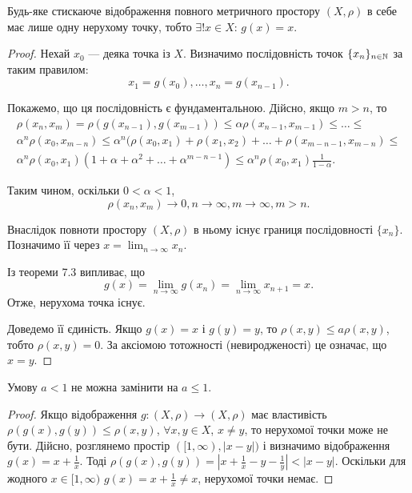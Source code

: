 \begin{theorem}
Будь-яке стискаюче відображення повного
метричного простору $(X, \rho)$ в себе має лише одну
нерухому точку, тобто $\exists! x \in X$: $g(x) = x$.
\end{theorem}

\begin{proof}
Нехай $x_0$ --- деяка точка із $X$. Визначимо
послідовність точок $\{x_n\}_{n \in \mathbb{N}}$ за таким правилом:
\begin{equation*}
    x_1 = g(x_0), \dots, x_n = g(x_{n - 1}).
\end{equation*}

Покажемо, що ця послідовність є фундаментальною.
Дійсно, якщо $m > n$, то
\begin{multline*}
    \rho(x_n, x_m) = \rho(g(x_{n - 1}), g(x_{m - 1})) \le
    \alpha \rho(x_{n - 1}, x_{m - 1}) \le \dots \le \\
    \alpha^n \rho(x_0, x_{m - n}) \le
    \alpha^n ( \rho(x_0, x_1) + \rho(x_1, x_2) + \dots + \rho(x_{m - n - 1}, x_{m - n}) \le \\
    \alpha^n \rho(x_0, x_1) (1 + \alpha + \alpha^2 + \dots + \alpha^{m - n - 1}) \le
    \alpha^n \rho(x_0, x_1) \tfrac{1}{1 - \alpha}.
\end{multline*}

Таким чином, оскільки $0 < \alpha < 1$,
\begin{equation*}
    \rho(x_n, x_m) \to 0, n \to \infty, m \to \infty, m > n.
\end{equation*}

Внаслідок повноти простору $(X, \rho)$ в ньому існує границя
послідовності $\{x_n\}$. Позначимо її через $x = \lim_{n \to \infty} x_n$.

Із теореми 7.3 випливає, що
\begin{equation*}
    g(x) = \lim_{n \to \infty} g(x_n) = \lim_{n \to \infty} x_{n + 1} = x.
\end{equation*}
Отже, нерухома точка існує.

Доведемо її єдиність. Якщо $g(x) = x$ і $g(y) = y$, то
$\rho(x, y) \le a \rho(x, y)$, тобто $\rho(x, y) = 0$.
За аксіомою тотожності (невиродженості) це означає, що $x = y$. 
\end{proof}

\begin{corollary}
Умову $a < 1$ не можна замінити на $a \le 1$.
\end{corollary}

\begin{proof}
Якщо відображення $g: (X, \rho) \to (X, \rho)$
має властивість $\rho(g(x), g(y)) \le \rho(x, y)$,
$\forall x, y \in X$, $x \ne y$,
то нерухомої точки може не бути.
Дійсно, розглянемо простір $([1, \infty), |x - y|)$
і визначимо відображення $g(x) = x + \frac{1}{x}$.
Тоді $\rho(g(x), g(y)) = |x + \frac{1}{x} - y - \frac{1}{y}| < |x - y|$. 
Оскільки для жодного $x \in [1, \infty)$
$g(x) = x + \frac{1}{x} \ne x$,
нерухомої точки немає.
\end{proof}

